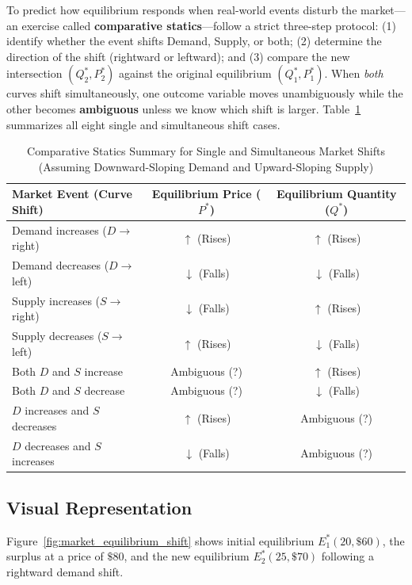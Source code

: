\documentclass[11pt,letterpaper]{article}
\begin{document}
To predict how equilibrium responds when real-world events disturb the market—an exercise called \textbf{comparative statics}—follow a strict three-step protocol: (1) identify whether the event shifts Demand, Supply, or both; (2) determine the direction of the shift (rightward or leftward); and (3) compare the new intersection $(Q_2^*, P_2^*)$ against the original equilibrium $(Q_1^*, P_1^*)$. When \emph{both} curves shift simultaneously, one outcome variable moves unambiguously while the other becomes \textbf{ambiguous} unless we know which shift is larger. Table~\ref{tab:comparative_statics} summarizes all eight single and simultaneous shift cases.

\begin{table}[htbp]
\centering
\caption{Comparative Statics Summary for Single and Simultaneous Market Shifts (Assuming Downward-Sloping Demand and Upward-Sloping Supply)}
\label{tab:comparative_statics}
\begin{tabular}{@{}lcc@{}}
\toprule
\textbf{Market Event (Curve Shift)} & \textbf{Equilibrium Price ($P^*$)} & \textbf{Equilibrium Quantity ($Q^*$)} \\
\midrule
Demand increases ($D \to$ right) & $\uparrow$ (Rises) & $\uparrow$ (Rises) \\
Demand decreases ($D \to$ left) & $\downarrow$ (Falls) & $\downarrow$ (Falls) \\
Supply increases ($S \to$ right) & $\downarrow$ (Falls) & $\uparrow$ (Rises) \\
Supply decreases ($S \to$ left) & $\uparrow$ (Rises) & $\downarrow$ (Falls) \\
\midrule
Both $D$ and $S$ increase & Ambiguous (?) & $\uparrow$ (Rises) \\
Both $D$ and $S$ decrease & Ambiguous (?) & $\downarrow$ (Falls) \\
$D$ increases and $S$ decreases & $\uparrow$ (Rises) & Ambiguous (?) \\
$D$ decreases and $S$ increases & $\downarrow$ (Falls) & Ambiguous (?) \\
\bottomrule
\end{tabular}
\end{table}

\subsection*{Visual Representation}
Figure~\ref{fig:market_equilibrium_shift} shows initial equilibrium $E_1^*(20, \$60)$, the surplus at a price of $\$80$, and the new equilibrium $E_2^*(25, \$70)$ following a rightward demand shift.
\end{document}
